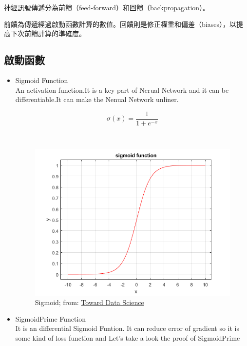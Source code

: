 \documentclass[14pt,a4paper]{report}  %
\begin{document}
神經訊號傳遞分為前饋（feed-forward）和回饋（backpropagation）。

前饋為傳遞經過啟動函數計算的數值。回饋則是修正權重和偏差（biases），以提高下次前饋計算的準確度。
\subsection{啟動函數}
\begin{itemize}
\item Sigmoid Function\\
\qquad An activation function.It is a key part of Nerual Network and it can be differentiable.It can make the Nenual Network unliner.\\
\begin{Large}$$\sigma(x)=\frac{1}{1+e^{-x}}$$ \end{Large}\\[6pt]
\begin{figure}[hbt!]
\begin{center}
\includegraphics[scale=0.74]{sigmoid_function}
\caption{Sigmoid; 
from: \href{https://towardsdatascience.com/derivative-of-the-sigmoid-function-536880cf918e}{Toward Data Science}}
\end{center}
\end{figure}
\item SigmoidPrime Function\\
\qquad It is an differential Sigmoid Funtion. It can reduce  error of gradient so it is some kind of loss function and Let's take a look the proof of SigmoidPrime\\

\end{itemize}
\end{document}
